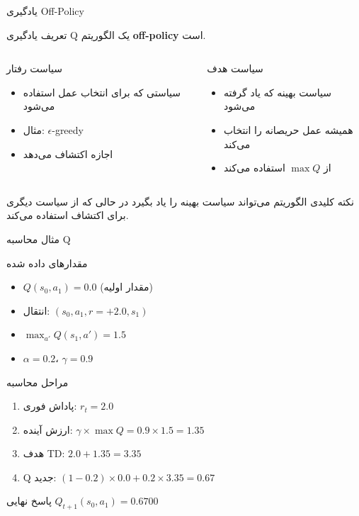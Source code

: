 \documentclass[aspectratio=169]{beamer}
\begin{document}
\begin{frame}{یادگیری Off-Policy}
\begin{block}{تعریف}
یادگیری Q یک الگوریتم \textbf{off-policy} است.
\end{block}

\begin{columns}
\begin{block}{سیاست رفتار}
\begin{itemize}
\item سیاستی که برای انتخاب عمل استفاده می‌شود
\item مثال: $\epsilon$-greedy
\item اجازه اکتشاف می‌دهد
\end{itemize}
\end{block}

\begin{block}{سیاست هدف}
\begin{itemize}
\item سیاست بهینه که یاد گرفته می‌شود
\item همیشه عمل حریصانه را انتخاب می‌کند
\item از $\max Q$ استفاده می‌کند
\end{itemize}
\end{block}
\end{columns}

\begin{block}{نکته کلیدی}
الگوریتم می‌تواند سیاست بهینه را یاد بگیرد در حالی که از سیاست دیگری برای اکتشاف استفاده می‌کند.
\end{block}
\end{frame}

\begin{frame}{مثال محاسبه Q}
\begin{block}{مقدارهای داده شده}
\begin{itemize}
\item $Q(s_0, a_1) = 0.0$ (مقدار اولیه)
\item انتقال: $(s_0, a_1, r=+2.0, s_1)$
\item $\max_{a'} Q(s_1, a') = 1.5$
\item $\alpha = 0.2$، $\gamma = 0.9$
\end{itemize}
\end{block}

\begin{block}{مراحل محاسبه}
\begin{enumerate}
\item پاداش فوری: $r_t = 2.0$
\item ارزش آینده: $\gamma \times \max Q = 0.9 \times 1.5 = 1.35$
\item هدف TD: $2.0 + 1.35 = 3.35$
\item Q جدید: $(1-0.2) \times 0.0 + 0.2 \times 3.35 = 0.67$
\end{enumerate}
\end{block}

\begin{block}{پاسخ نهایی}
$Q_{t+1}(s_0, a_1) = 0.6700$
\end{block}
\end{frame}
\end{document}
